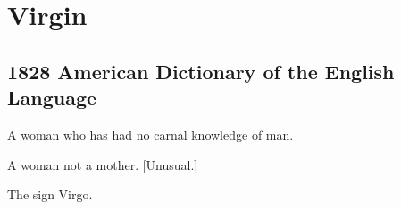\section{Virgin}
	\label{VIRGIN}
	

\subsection{1828 American Dictionary of the English Language} %
	\label{VIRGIN-1828}

	\begin{compactitem}
		\item[1] A woman who has had no carnal knowledge of man.
		\item[2] A woman not a mother. [Unusual.]
		\item[3] The sign Virgo.
	\end{compactitem}




	
	
